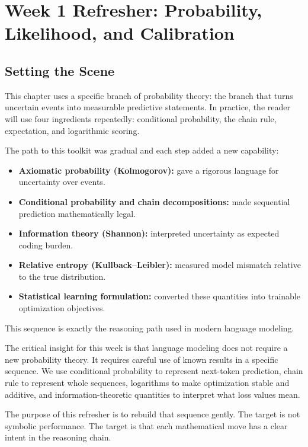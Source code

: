 \section{Week 1 Refresher: Probability, Likelihood, and Calibration}

\subsection*{Setting the Scene}
This chapter uses a specific branch of probability theory: the branch that turns uncertain events into measurable predictive statements. In practice, the reader will use four ingredients repeatedly: conditional probability, the chain rule, expectation, and logarithmic scoring.

The path to this toolkit was gradual and each step added a new capability:
\begin{itemize}[leftmargin=1.5em]
  \item \textbf{Axiomatic probability (Kolmogorov):} gave a rigorous language for uncertainty over events.
  \item \textbf{Conditional probability and chain decompositions:} made sequential prediction mathematically legal.
  \item \textbf{Information theory (Shannon):} interpreted uncertainty as expected coding burden.
  \item \textbf{Relative entropy (Kullback--Leibler):} measured model mismatch relative to the true distribution.
  \item \textbf{Statistical learning formulation:} converted these quantities into trainable optimization objectives.
\end{itemize}
This sequence is exactly the reasoning path used in modern language modeling.

The critical insight for this week is that language modeling does not require a new probability theory. It requires careful use of known results in a specific sequence. We use conditional probability to represent next-token prediction, chain rule to represent whole sequences, logarithms to make optimization stable and additive, and information-theoretic quantities to interpret what loss values mean.

The purpose of this refresher is to rebuild that sequence gently. The target is not symbolic performance. The target is that each mathematical move has a clear intent in the reasoning chain.

